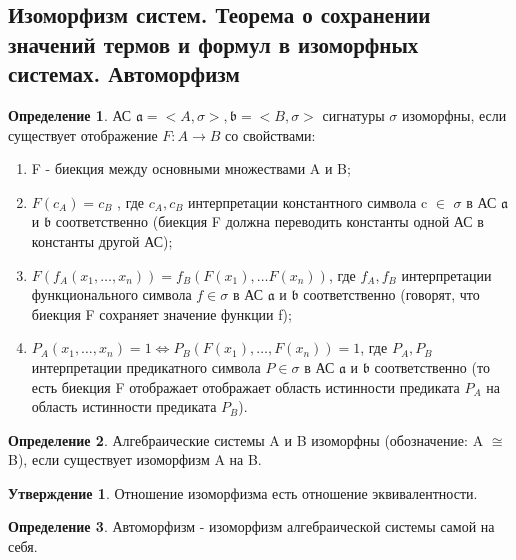 \documentclass[a4paper]{article}
\theoremstyle{definition}
\newtheorem*{definition}{Определение}
\newtheorem*{statement}{Утверждение}
\theoremstyle{remark}
\begin{document}
    \subsection{Изоморфизм систем. Теорема о сохранении значений термов и формул в изоморфных системах. Автоморфизм}
    \begin{definition}
        АС $\mathfrak{a} = <A, \sigma>, \mathfrak{b} = <B, \sigma>$ сигнатуры $\sigma$ изоморфны, если существует отображение
        $F : A \to B$ со свойствами:
        \begin{enumerate}
            \item F - биекция между основными множествами A и B;
            \item $F(c_A) = c_B$ , где $c_A, c_B$ интерпретации константного символа c $\in$ $\sigma$ в АС
            $\mathfrak{a}$ и $\mathfrak{b}$ соответственно (биекция F должна переводить константы одной АС в
            константы другой АС);
            \item $F(f_A(x_1, \dots , x_n)) = f_B(F(x_1), \dots F(x_n))$, где $f_A, f_B$ интерпретации функционального символа 
            $f \in \sigma$ в АС $\mathfrak{a}$ и $\mathfrak{b}$ соответственно (говорят, что биекция
            F сохраняет значение функции f);
            \item $P_A(x_1, \dots , x_n) = 1 \Leftrightarrow P_B(F(x_1), \dots , F(x_n)) = 1$, где $P_A, P_B$ интерпретации предикатного 
            символа $P \in \sigma$ в АС $\mathfrak{a}$ и $\mathfrak{b}$ соответственно (то есть биекция F отображает отображает область 
            истинности предиката $P_A$ на область истинности предиката $P_B$).
        \end{enumerate}
    \end{definition}
    \begin{definition}
        Алгебраические системы A и B изоморфны (обозначение: A $\cong$ B), если существует 
        изоморфизм A на B.
    \end{definition}
    \begin{statement}
        Отношение изоморфизма есть отношение эквивалентности.
    \end{statement}
    \begin{definition}
        Автоморфизм - изоморфизм алгебраической системы самой на себя.
    \end{definition}
\end{document}
